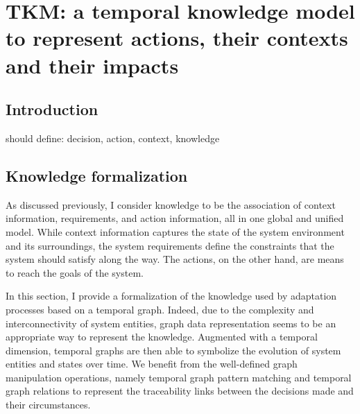 \chapter[TKM: a temporal knowledge model]{TKM: a temporal knowledge model to represent actions, their contexts and their impacts}
 
 \section{Introduction}
 
should define: decision, action, context, knowledge
 
 \section{Knowledge formalization}
 
  As discussed previously, I consider \gls{knowledge} to be the association of \gls{context} information, \glspl{requirement}, and \gls{action} information, all in one global and unified model.
 While \gls{context} information captures the state of the system environment and its surroundings, the system \glspl{requirement} define the constraints that the system should satisfy along the way. 
 The \glspl{action}, on the other hand, are means to reach the goals of the system.
  
 In this section, I provide a formalization of the \gls{knowledge} used by adaptation processes based on a temporal graph. 
Indeed, due to the complexity and interconnectivity of system entities, graph data representation seems to be an appropriate way to represent the \gls{knowledge}. 
Augmented with a temporal dimension, temporal graphs are then able to symbolize the evolution of system entities and states over time. 
We benefit from the well-defined graph manipulation operations, namely temporal graph pattern matching and temporal graph relations to represent the traceability links between the \glspl{decision} made and their \glspl{circumstance}.

